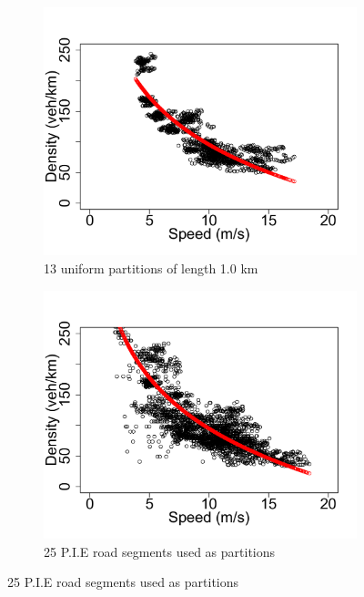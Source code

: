 \documentclass[procedia]{easychair}
\begin{document}
 
\begin{figure}[!htbp]
\begin{subfigure}{.5\linewidth}
\centering
\includegraphics[clip=true,trim=0.1cm 0cm 0.0cm 1.5cm,scale=0.35]{graphs/Simulated/density-vs-speed-1000m}
\caption{13 uniform partitions of length 1.0 km}
\label{fig:splitting-100m}
\end{subfigure}%
\begin{subfigure}{.5\linewidth}
\centering
\includegraphics[clip=true,trim=0.1cm 0cm 0.0cm 1.5cm,scale=0.35]{graphs/Simulated/density-vs-speed-pie}
\caption{25 P.I.E road segments used as partitions}
\label{fig:splitting-pie}

\end{subfigure}
\end{figure}
\end{document}
